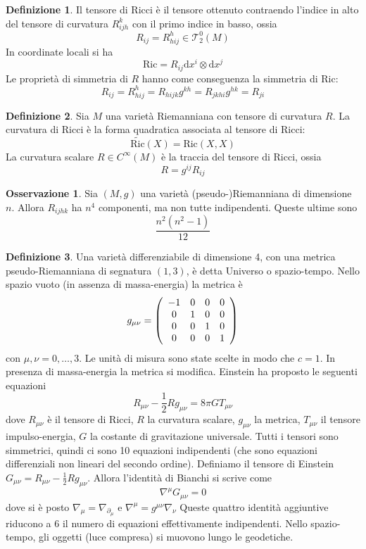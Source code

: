 \documentclass[a4paper,11pt]{article}
\theoremstyle{definition}
\newtheorem{osservazione}{Osservazione}[section]
\newtheorem{definizione}{Definizione}[section]
\theoremstyle{theorem}
\newcommand{\dif}{\mathrm{d}}
\newcommand{\T}{\mathcal{T}}
\newcommand{\ric}{\textrm{Ric}}
\begin{document}
\begin{definizione}
	Il tensore di Ricci è il tensore ottenuto contraendo l'indice in alto del tensore di curvatura $R_{ijh}^k$ con il primo indice in basso, ossia
	\[R_{ij}=R_{hij}^h\in\T^0_2(M)\]
	In coordinate locali si ha
	\[\ric=R_{ij}\dif x^i\otimes\dif x^j\]
	Le proprietà di simmetria di $R$ hanno come conseguenza la simmetria di $\ric$:
	\[R_{ij}=R_{hij}^h=R_{hijk}g^{kh}=R_{jkhi}g^{hk}=R_{ji}\]
\end{definizione}
\begin{definizione}
	Sia $M$ una varietà Riemanniana con tensore di curvatura $R$. La curvatura di Ricci è la forma quadratica associata al tensore di Ricci:
	\[\tilde{\ric}(X)=\ric(X,X)\]
	La curvatura scalare $R\in C^\infty(M)$ è la traccia del tensore di Ricci, ossia
	\[R=g^{ij}R_{ij}\]
\end{definizione}
\begin{osservazione}
	Sia $(M,g)$ una varietà (pseudo-)Riemanniana di dimensione $n$. Allora $R_{ijhk}$ ha $n^4$ componenti, ma non tutte indipendenti. Queste ultime sono
	\[\frac{n^2(n^2-1)}{12}\]
\end{osservazione}
\begin{definizione}
	Una varietà differenziabile di dimensione 4, con una metrica pseudo-Riemanniana di segnatura $(1,3)$, è detta Universo o spazio-tempo. Nello spazio vuoto (in assenza di massa-energia) la metrica è
	\[g_{\mu\nu}=\left(\begin{array}{c c c c}
	-1&0&0&0\\
	0&1&0&0\\
	0&0&1&0\\
	0&0&0&1
	\end{array}\right)\]
	con $\mu,\nu=0,\dots,3$. Le unità di misura sono state scelte in modo che $c=1$. In presenza di massa-energia la metrica si modifica. Einstein ha proposto le seguenti equazioni
	\[R_{\mu\nu}-\frac{1}{2}Rg_{\mu\nu}=8\pi G T_{\mu\nu}\]
	dove $R_{\mu\nu}$ è il tensore di Ricci, $R$ la curvatura scalare, $g_{\mu\nu}$ la metrica, $T_{\mu\nu}$ il tensore impulso-energia, $G$ la costante di gravitazione universale.
	Tutti i tensori sono simmetrici, quindi ci sono 10 equazioni indipendenti (che sono equazioni differenziali non lineari del secondo ordine). Definiamo il tensore di Einstein $G_{\mu\nu}=R_{\mu\nu}-\frac{1}{2}Rg_{\mu\nu}$. Allora l'identità di Bianchi si scrive come
	\[\nabla^\mu G_{\mu\nu}=0\]
	dove si è posto $\nabla_{\mu}=\nabla_{\partial_\mu}$ e $\nabla^\mu=g^{\mu\nu}\nabla_\nu$
	Queste quattro identità aggiuntive riducono a 6 il numero di equazioni effettivamente indipendenti. Nello spazio-tempo, gli oggetti (luce compresa) si muovono lungo le geodetiche.
\end{definizione}
\end{document}
